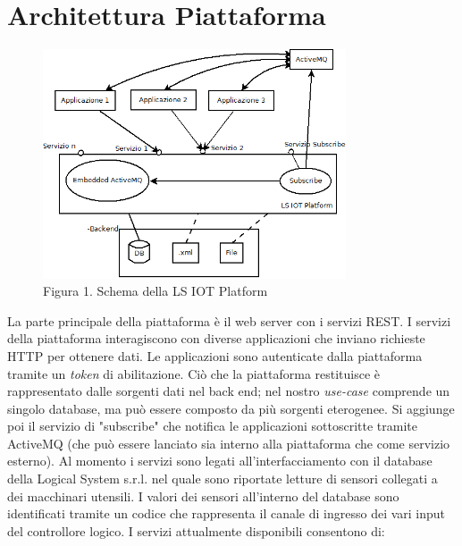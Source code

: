 \section{Architettura Piattaforma}
\begin{figure}[h]
	\centering
	\includegraphics[width=0.8\textwidth]{architettura-piattaforma.png}
	\caption*{Figura 1. Schema della LS IOT Platform}
\end{figure}
La parte principale della piattaforma è il web server con i servizi REST. I servizi della piattaforma interagiscono con diverse applicazioni che inviano richieste HTTP per ottenere dati. Le applicazioni sono autenticate dalla piattaforma tramite un \textit{token} di abilitazione. Ciò che la piattaforma restituisce è rappresentato dalle sorgenti dati nel back end; nel nostro \textit{use-case} comprende un singolo database, ma può essere composto da più sorgenti eterogenee. Si aggiunge poi il servizio di "subscribe" che notifica le applicazioni sottoscritte tramite ActiveMQ (che può essere lanciato sia interno alla piattaforma che come servizio esterno).
Al momento i servizi sono legati all’interfacciamento con il database della Logical System s.r.l. nel quale sono riportate letture di sensori collegati a dei macchinari utensili. I valori dei sensori all'interno del database sono identificati tramite un codice che rappresenta il canale di ingresso dei vari input del controllore logico.
I servizi attualmente disponibili consentono di:
